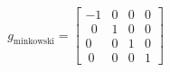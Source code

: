 \documentclass[preview]{standalone}
\begin{document}
\begin{align*}
g_\text{minkowski} = \begin{bmatrix} -1 & 0 & 0 & 0 \\ \
                \ 0 & 1 & 0 & 0 \\ 0 & 0 & 1 & 0 \\ \
                0 & 0 & 0 & 1 \end{bmatrix}
\end{align*}
\end{document}
